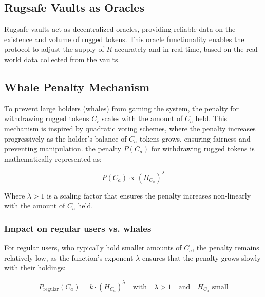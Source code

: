 \documentclass{article}
\begin{document}
\subsection{Rugsafe Vaults as Oracles}
Rugsafe vaults act as decentralized oracles, providing reliable data on the existence and volume of rugged tokens. This oracle functionality enables the protocol to adjust the supply of $R$ accurately and in real-time, based on the real-world data collected from the vaults.

























\subsection{Whale Penalty Mechanism}
To prevent large holders (whales) from gaming the system, the penalty for withdrawing rugged tokens $C_r$ scales with the amount of $C_a$ held. This mechanism is inspired by quadratic voting schemes, where the penalty increases progressively as the holder's balance of $C_a$ tokens grows, ensuring fairness and preventing manipulation. the penalty $P(C_a)$ for withdrawing rugged tokens is mathematically represented as:


\[
P(C_a) \propto \left(H_{C_a}\right)^\lambda
\]

Where $\lambda > 1$ is a scaling factor that ensures the penalty increases non-linearly with the amount of $C_a$ held.

\subsubsection{Impact on regular users vs. whales}

For regular users, who typically hold smaller amounts of $C_a$, the penalty remains relatively low, as the function’s exponent $\lambda$ ensures that the penalty grows slowly with their holdings:

\[
P_{\text{regular}}(C_a) = k \cdot \left(H_{C_a}\right)^\lambda \quad \text{with} \quad \lambda > 1 \quad \text{and} \quad H_{C_a} \text{ small}
\]
\end{document}
